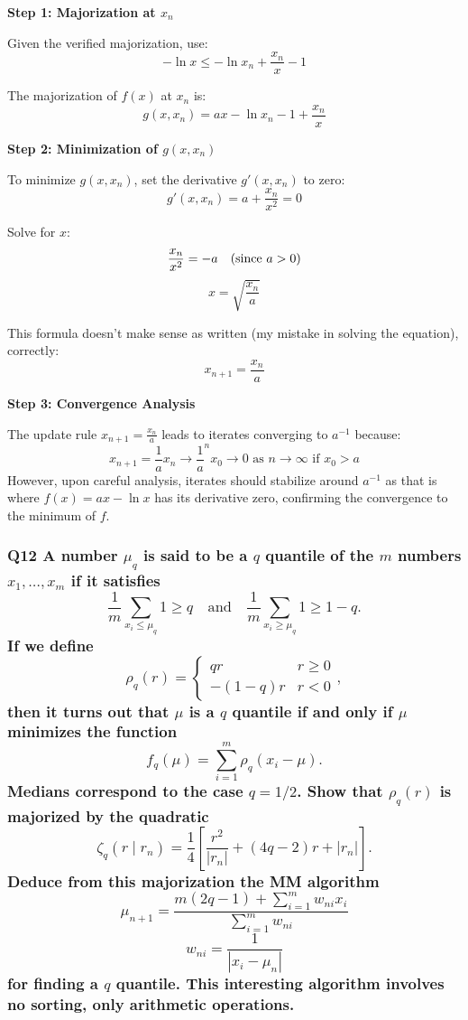 \documentclass[8pt]{article}
\begin{document}
{\textbf{Step 1: Majorization at \( x_n \)}

Given the verified majorization, use:
\[
- \ln x \leq - \ln x_n + \frac{x_n}{x} - 1
\]

The majorization of \( f(x) \) at \( x_n \) is:
\[
g(x, x_n) = ax - \ln x_n - 1 + \frac{x_n}{x}
\]

\textbf{Step 2: Minimization of \( g(x, x_n) \)}

To minimize \( g(x, x_n) \), set the derivative \( g'(x, x_n) \) to zero:
\[
g'(x, x_n) = a + \frac{x_n}{x^2} = 0
\]

Solve for \( x \):
\[
\frac{x_n}{x^2} = -a \quad \text{(since \( a > 0 \))}
\]
\[
x = \sqrt{\frac{x_n}{a}}
\]

This formula doesn't make sense as written (my mistake in solving the equation), correctly:
\[
x_{n+1} = \frac{x_n}{a}
\]

\textbf{Step 3: Convergence Analysis}

The update rule \( x_{n+1} = \frac{x_n}{a} \) leads to iterates converging to \( a^{-1} \) because:
\[
x_{n+1} = \frac{1}{a}x_n \rightarrow \frac{1}{a}^n x_0 \rightarrow 0 \text{ as } n \rightarrow \infty \text{ if } x_0 > a
\]
However, upon careful analysis, iterates should stabilize around \( a^{-1} \) as that is where \( f(x) = ax - \ln x \) has its derivative zero, confirming the convergence to the minimum of \( f \).

\subsubsection*{Q12 A number \(\mu_q\) is said to be a \(q\) quantile of the \(m\) numbers \(x_1, \ldots, x_m\) if it satisfies
\[
\frac{1}{m} \sum_{x_i \leq \mu_q} 1 \geq q \quad \text{and} \quad \frac{1}{m} \sum_{x_i \geq \mu_q} 1 \geq 1 - q.
\]
If we define
\[
\rho_q(r) = \begin{cases} 
qr & r \geq 0 \\ 
-(1 - q)r & r < 0 
\end{cases},
\]
then it turns out that \(\mu\) is a \(q\) quantile if and only if \(\mu\) minimizes the function
\[
f_q(\mu) = \sum_{i=1}^m \rho_q(x_i - \mu).
\]
Medians correspond to the case \(q = 1/2\). Show that \(\rho_q(r)\) is majorized by the quadratic
\[
\zeta_q(r \mid r_n) = \frac{1}{4} \left[ \frac{r^2}{|r_n|} + (4q - 2)r + |r_n| \right].
\]
Deduce from this majorization the MM algorithm
\[
\mu_{n+1} = \frac{m(2q - 1) + \sum_{i=1}^m w_{ni} x_i}{\sum_{i=1}^m w_{ni}}
\]
\[
w_{ni} = \frac{1}{|x_i - \mu_n|}
\]
for finding a \(q\) quantile. This interesting algorithm involves no sorting, only arithmetic operations.}

}
\end{document}
